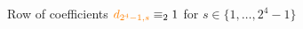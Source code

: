 
\begin{figure}[p]

    \noindent{}

    \captionsetup{singlelinecheck=off}
    \caption[Each row $\vect{r}_{2^{\alpha}-1}$ has odd coefficients only]{
        Row of coefficients $\textcolor{orange}{d_{2^{4}-1,s}} \equiv_{2} 1$ 
        for $s\in\lbrace1,\ldots,2^{4}-1 \rbrace$ }

    \label{fig:catalan-odd-row}

\end{figure}
